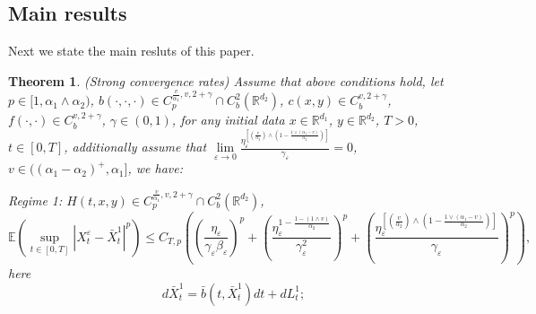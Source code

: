 \documentclass[11pt,reqno]{amsart}
\newtheorem{theorem}{\indent Theorem}[section]
\numberwithin{equation}{section}
\begin{document}
\subsection{Main results}
Next we state the main resluts of this paper.
\begin{theorem}\label{SCRJ}(Strong convergence rates)
	Assume that above conditions hold, let $p\in [1,\alpha_{1}\wedge\alpha_{2})$, $b(\cdot,\cdot,\cdot)\in C_{p}^{\frac{v}{\alpha_{1}},v, 2+\gamma}\cap C_{b}^{2}(\mathbb{R}^{d_{2}})$, $c(x,y)\in C_{b}^{v, 2+\gamma}$, $f(\cdot,\cdot)\in C_{b}^{v, 2+\gamma}$,  $\gamma\in (0,1)$, for any initial data $x\in \mathbb{R}^{d_{1}}$, $y\in \mathbb{R}^{d_{2}}$, $T>0$, $t\in[0,T]$, additionally assume that $	 \lim\limits_{\varepsilon \rightarrow0}\frac{\eta_{\varepsilon}^{\left[ \left( \frac{v}{\alpha_{2}}\right) \wedge \left( 1-\frac{1\vee(\alpha_{1}-v)}{\alpha_{2}}\right) \right] }}{\gamma_{\varepsilon} } =0$,   $v\in((\alpha_{1}-\alpha_{2})^{+},\alpha_{1}]$, we have:
	
	Regime 1:  $H(t,x,y)\in C_{p}^{\frac{v}{\alpha_{1}},v, 2+\gamma}\cap C_{b}^{2}(\mathbb{R}^{d_{2}})$, 
	\begin{equation}\nonumber
		\mathbb{E}\left( \sup_{t\in [0,T]}|X_{t}^{\varepsilon}-\bar{X}^{1}_{t}|^{p}\right) \leq   C_{T,p}\left(\left(  \frac{\eta_{\varepsilon}}{\gamma_{\varepsilon}\beta_{\varepsilon}}\right) ^{p}+\left(  \frac{\eta_{\varepsilon}^{1-\frac{1-(1\wedge v)}{\alpha_{2}}}}{\gamma_{\varepsilon}^{2}}\right) ^{p}+\left( \frac{\eta_{\varepsilon}^{\left[ \left( \frac{v}{\alpha_{2}}\right) \wedge \left( 1-\frac{1\vee(\alpha_{1}-v)}{\alpha_{2}}\right) \right] }}{\gamma_{\varepsilon} } \right) ^{p}\right) ,
	\end{equation}
	here 
	\begin{equation}\label{S1}
		d\bar{X}^{1}_{t}=\bar{b}(t,\bar{X}^{1}_{t})dt+dL_{t}^{1};
	\end{equation}
	

\end{theorem}
\end{document}
